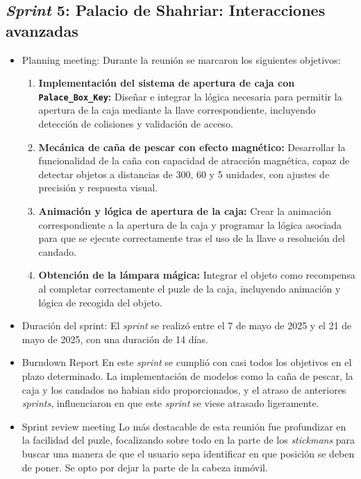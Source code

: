 \subsection{\textbf{\textit{Sprint} 5: Palacio de Shahriar: Interacciones avanzadas }}
\begin{itemize}
\item {Planning meeting}:
Durante la reunión se marcaron los siguientes objetivos:

\begin{enumerate}
\item \textbf{Implementación del sistema de apertura de caja con \texttt{Palace\_Box\_Key}:}  
  Diseñar e integrar la lógica necesaria para permitir la apertura de la caja mediante la llave correspondiente, incluyendo detección de colisiones y validación de acceso.

\item \textbf{Mecánica de caña de pescar con efecto magnético:}  
  Desarrollar la funcionalidad de la caña con capacidad de atracción magnética, capaz de detectar objetos a distancias de 300, 60 y 5 unidades, con ajustes de precisión y respuesta visual.

\item \textbf{Animación y lógica de apertura de la caja:}  
  Crear la animación correspondiente a la apertura de la caja y programar la lógica asociada para que se ejecute correctamente tras el uso de la llave o resolución del candado.

\item \textbf{Obtención de la lámpara mágica:}  
  Integrar el objeto como recompensa al completar correctamente el puzle de la caja, incluyendo animación y lógica de recogida del objeto.
\end{enumerate}

    \item {Duración del sprint:}
El \textit{sprint } se realizó entre el 7 de mayo de 2025 y el 21 de mayo de 2025, con una duración de 14 días.

    \item {Burndown Report}
En este \textit{sprint} se cumplió con casi todos los objetivos en el plazo determinado. La implementación de modelos como la caña de pescar, la caja y los candados no habian sido proporcionados, y el atraso de anteriores \textit{sprints}, influenciaron en que este \textit{sprint} se viese atrasado ligeramente.

\item {Sprint review meeting}
Lo más destacable de esta reunión fue profundizar en la facilidad del puzle, focalizando sobre todo en la parte de los \textit{stickmans} para buscar una manera de que el usuario sepa identificar en que posición se deben de poner. Se opto por dejar la parte de la cabeza inmóvil. 
\end{itemize}

